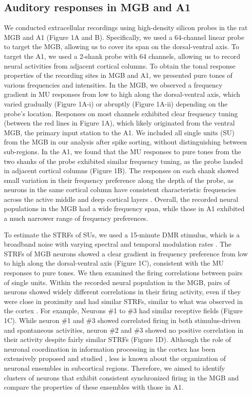 \documentclass[11pt]{article}
\begin{document}
\subsection*{Auditory responses in MGB and A1}
We conducted extracellular recordings using high-density silicon probes in the rat MGB and A1 (Figure 1A and B). Specifically, we used a 64-channel linear probe to target the MGB, allowing us to cover its span on the dorsal-ventral axis. To target the A1, we used a 2-shank probe with 64 channels, allowing us to record neural activities from adjacent cortical columns. To obtain the tonal response properties of the recording sites in MGB and A1, we presented pure tones of various frequencies and intensities. In the MGB, we observed a frequency gradient in MU responses from low to high along the dorsal-ventral axis, which varied gradually (Figure 1A-i) or abruptly (Figure 1A-ii) depending on the probe's location. Responses on most channels exhibited clear frequency tuning (between the red lines in Figure 1A), which likely originated from the ventral MGB, the primary input station to the A1. We included all single units (SU) from the MGB in our analysis after spike sorting, without distinguishing between sub-regions. In the A1, we found that the MU responses to pure tones from the two shanks of the probe exhibited similar frequency tuning, as the probe landed in adjacent cortical columns (Figure 1B). The responses on each shank showed small variation in their frequency preference along the depth of the probe, as neurons in the same cortical column have consistent characteristic frequencies across the active middle and deep cortical layers \citep{Merzenich1975, atencio2010laminar}. Overall, the recorded neural populations in the MGB had a wide frequency span, while those in A1 exhibited a much narrower range of frequency preferences.

To estimate the STRFs of SUs, we used a 15-minute DMR stimulus, which is a broadband noise with varying spectral and temporal modulation rates \citep{Escabi2002}. The STRFs of MGB neurons showed a clear gradient in frequency preference from low to high along the dorsal-ventral axis (Figure 1C), consistent with the MU responses to pure tones. We then examined the firing correlations between pairs of single units. Within the recorded neural population in the MGB, pairs of neurons showed widely different correlations in their firing activity, even if they were close in proximity and had similar STRFs, similar to what was observed in the cortex \citep{See2018, Mogensen2019, Wahlbom2021}. For example, Neurons \#1 to \#3 had similar receptive fields (Figure 1C). While neuron \#1 and \#3 showed correlated firing in both stimulus-driven and spontaneous activities, neuron \#2 and \#3 showed no positive correlation in their activity despite fairly similar STRFs (Figure 1D). Although the role of neuronal coordination in information processing in the cortex has been extensively proposed and studied \citep{Paninski2004, Buzsaki2010, Bizley2010, Carrillo-Reid2015, See2018}, less is known about the organization of neuronal ensembles in subcortical regions. Therefore, we aimed to identify clusters of neurons that exhibit consistent synchronized firing in the MGB and compare the properties of these ensembles with those in A1.
\end{document}
